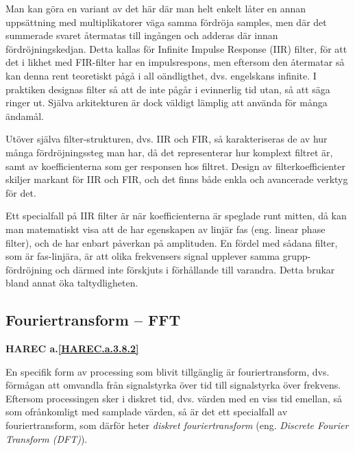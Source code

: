 Man kan göra en variant av det här där man helt enkelt låter en annan
uppsättning med multiplikatorer väga samma fördröja samples, men där det
summerade svaret återmatas till ingången och adderas där innan
fördröjningskedjan.
Detta kallas för Infinite Impulse Response (IIR) filter, för att det i likhet
med FIR-filter har en impulsrespons, men eftersom den återmatar så kan denna
rent teoretiskt pågå i all oändligthet, dvs. engelskans infinite.
I praktiken designas filter så att de inte pågår i evinnerlig tid utan, så att
säga ringer ut.
Själva arkitekturen är dock väldigt lämplig att använda för många ändamål.

Utöver själva filter-strukturen, dvs. IIR och FIR, så karakteriseras de av hur
många fördröjningssteg man har, då det representerar hur komplext filtret är,
samt av koefficienterna som ger responsen hos filtret.
Design av filterkoefficienter skiljer markant för IIR och FIR, och det finns
både enkla och avancerade verktyg för det.

Ett specialfall på IIR filter är när koefficienterna är speglade runt mitten,
då kan man matematiskt visa att de har egenskapen av linjär fas (eng. linear
phase filter), och de har enbart påverkan på amplituden.
En fördel med sådana filter, som är fas-linjära, är att olika frekvensers
signal upplever samma grupp-fördröjning och därmed inte förskjuts i förhållande
till varandra.
Detta brukar bland annat öka taltydligheten.

\subsection{Fouriertransform -- FFT}
\textbf{HAREC a.\ref{HAREC.a.3.8.2}\label{myHAREC.a.3.8.2}}

En specifik form av processing som blivit tillgänglig är fouriertransform,
dvs. förmågan att omvandla från signalstyrka över tid till signalstyrka över
frekvens.
Eftersom processingen sker i diskret tid, dvs. värden med en viss tid emellan,
så som ofrånkomligt med samplade värden, så är det ett specialfall av
fouriertransform, som därför heter \emph{diskret fouriertransform}  (eng.
\emph{Discrete Fourier Transform (DFT)}).

